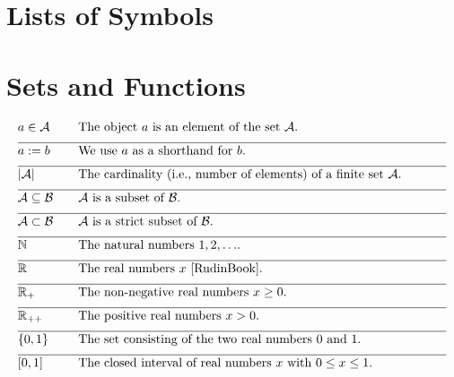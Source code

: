 
\section*{Lists of Symbols}

\vspace*{-2mm}
\section*{Sets and Functions} 

\begin{align} 
	&a \in \mathcal{A} & \quad & \parbox{.85\textwidth}{The object $a$ is an element of the set $\mathcal{A}$.} \nonumber \\[2mm] \hline \nonumber\\[-5mm]
	&a \defeq b & \quad & \mbox{We use $a$ as a shorthand for $b$. }\nonumber \\[2mm] \hline \nonumber\\[-5mm]
	&|\mathcal{A}| & \quad & \mbox{The cardinality (i.e., number of elements) of a finite set $\mathcal{A}$.}\nonumber \\[2mm] \hline \nonumber\\[-5mm]
	&\mathcal{A} \subseteq \mathcal{B}& \quad & \mbox{$\mathcal{A}$ is a subset of $\mathcal{B}$.}\nonumber \\[2mm] \hline \nonumber\\[-5mm]
	&\mathcal{A} \subset \mathcal{B}& \quad & \mbox{$\mathcal{A}$ is a strict subset of $\mathcal{B}$.} \nonumber \\[2mm] \hline \nonumber\\[-5mm]
	&\mathbb{N} & \quad & \mbox{The natural numbers $1,2,\ldots$.}\nonumber \\[2mm] \hline \nonumber\\[-5mm]
	&\mathbb{R}  &\quad &\mbox{The real numbers $x$ \cite{RudinBook}.} \nonumber \\[2mm] \hline \nonumber\\[-5mm]
	&\mathbb{R}_{+}  &\quad &\mbox{The non-negative real numbers $x\geq0$.}\nonumber \\[2mm] \hline \nonumber\\[-5mm]
	&\mathbb{R}_{++}  &\quad &\mbox{The positive real numbers $x> 0$.} \nonumber \\[2mm] \hline \nonumber\\[-5mm]
	&\{0,1\}& \quad & \mbox{The set consisting of the two real numbers $0$ and $1$.} \nonumber \\[2mm] \hline \nonumber\\[-5mm]
	&[0,1] &\quad &\mbox{The closed interval of real numbers $x$ with $0 \leq x \leq 1$. }\nonumber 
\end{align} 

